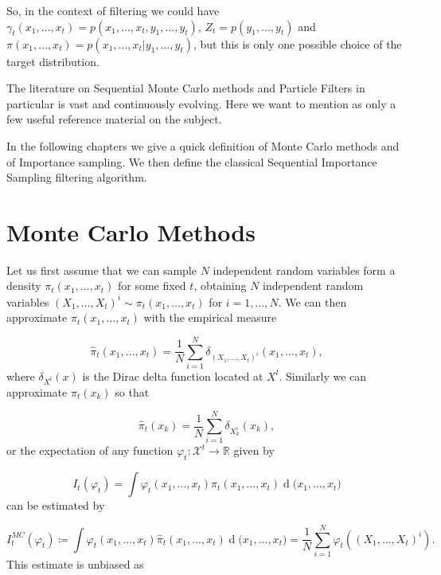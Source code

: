 \documentclass[11pt,a4paper]{article}
\renewcommand{\d}[1]{\ensuremath{\operatorname{d}\!{#1}}}
\begin{document}
So, in the context of filtering we could have $\gamma_t(x_1, \dots, x_t) = p(x_1, \dots, x_t, y_1, \dots, y_t)$, $Z_t = p(y_1, \dots, y_t)$ and $\pi(x_1, \dots, x_t) = p(x_1, \dots, x_t | y_1, \dots, y_t)$, but this is only one possible choice of the target distribution.

The literature on Sequential Monte Carlo methods and Particle Filters in particular is vast and continuously evolving. Here we want to mention \cite{DoucetBook} \cite{DoucetTutorial} \cite{Kantas} as only a few useful reference material on the subject.

In the following chapters we give a quick definition of Monte Carlo methods and of Importance sampling. We then define the classical Sequential Importance Sampling filtering algorithm.






\section{Monte Carlo Methods} \label{sec:MonteCarlo}

Let us first assume that we can sample $N$ independent random variables form a density $\pi_t(x_1, \dots, x_t)$ for some fixed $t$, obtaining $N$ independent random variables $(X_1, \dots, X_t)^i \sim \pi_t(x_1, \dots, x_t)$ for $i = 1, \dots, N$. We can then approximate $\pi_t(x_1, \dots, x_t)$ with the empirical measure

\begin{equation*}
    \hat{\pi}_t(x_1, \dots, x_t) = \frac{1}{N} \sum_{i=1}^N \delta_{(X_1, \dots, X_t)^i}(x_1, \dots, x_t),
\end{equation*}
where $\delta_{X^l}(x)$ is the Dirac delta function located at $X^l$. Similarly we can approximate $\pi_t(x_k)$ so that

\begin{equation*}
    \hat{\pi}_t(x_k) = \frac{1}{N} \sum_{i=1}^N \delta_{X_k^i}(x_k),
\end{equation*}
or the expectation of any function $\varphi_t : \mathcal{X}^t \rightarrow \mathbb{R}$ given by

\begin{equation*}
    I_t(\varphi_t) = \int \varphi_t (x_1, \dots, x_t) \pi_t (x_1, \dots, x_t) \d (x_1, \dots, x_t)
\end{equation*}
can be estimated by

\begin{equation*}
    I^{MC}_t(\varphi_t) \coloneqq \int \varphi_t(x_1, \dots, x_t) \hat{\pi}_t (x_1, \dots, x_t) \d (x_1, \dots, x_t) = \frac{1}{N} \sum_{i=1}^N \varphi_t((X_1, \dots, X_t)^i).
\end{equation*}
This estimate is unbiased as
\end{document}
